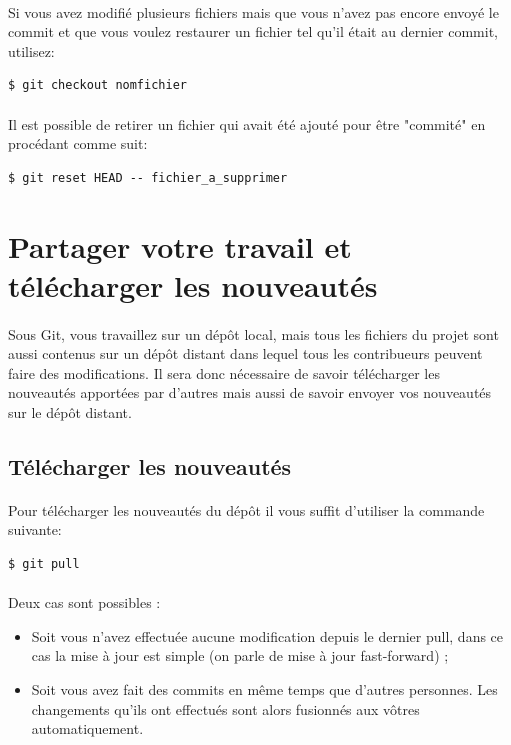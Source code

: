 \documentclass[french, a4paper, 12pt, titlepage]{article}
\begin{document}
\paragraph{}Si vous avez modifié plusieurs fichiers mais que vous n’avez pas encore envoyé le commit et que vous voulez restaurer un fichier tel qu’il était au dernier commit, utilisez:
\begin{lstlisting}
$ git checkout nomfichier
\end{lstlisting}
\paragraph{}Il est possible de retirer un fichier qui avait été ajouté pour être "commité" en procédant comme suit:
\begin{lstlisting}
$ git reset HEAD -- fichier_a_supprimer
\end{lstlisting}

\section{Partager votre travail et télécharger les nouveautés}
\paragraph{}Sous Git, vous travaillez sur un dépôt local, mais tous les fichiers du projet sont aussi contenus sur un dépôt distant dans lequel tous les contribueurs peuvent faire des modifications. Il sera donc nécessaire de savoir télécharger les nouveautés apportées par d'autres mais aussi de savoir envoyer vos nouveautés sur le dépôt distant.
\subsection{Télécharger les nouveautés}
\paragraph{}Pour télécharger les nouveautés du dépôt il vous suffit d'utiliser la commande suivante:
\begin{lstlisting}
$ git pull
\end{lstlisting}
\paragraph{}Deux cas sont possibles :
\begin{itemize}
\item Soit vous n’avez effectuée aucune modification depuis le dernier pull, dans ce cas la mise à jour est simple (on parle de mise à jour fast-forward) ;
\item Soit vous avez fait des commits en même temps que d’autres personnes. Les changements qu’ils ont effectués sont alors fusionnés aux vôtres automatiquement.
\end{itemize}
\end{document}
